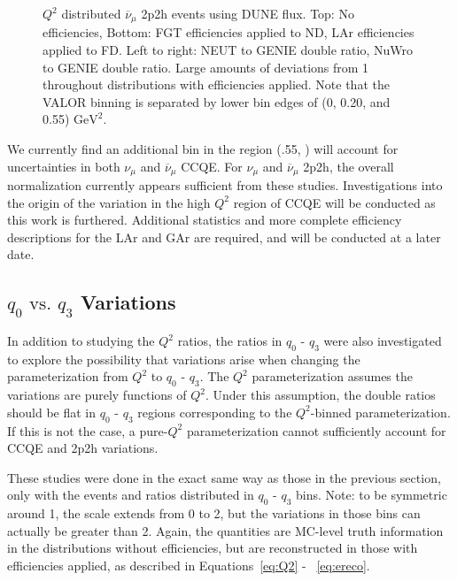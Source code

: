 \documentclass[12pt]{article}
\newcommand{\textapprox}{\raisebox{0.5ex}{\texttildelow}}
\begin{document}
\begin{figure}[h]
\endminipage
\caption{$Q^2$ distributed $\overline{\nu}_{\mu}$ 2p2h events using DUNE flux. Top: No efficiencies, Bottom: FGT efficiencies applied to ND, LAr efficiencies applied to FD. Left to right: NEUT to GENIE double ratio, NuWro to GENIE double ratio. Large amounts of deviations from 1 throughout distributions with efficiencies applied. Note that the VALOR binning is separated by lower bin edges of (0, 0.20, and 0.55) $\textrm{GeV}^2$.}
\label{fig:Q2_2p2h_numubar_no_eff}
\end{figure}
\FloatBarrier

We currently find an additional bin in the region (.55, \textapprox{1.25}) will account for uncertainties in both $\nu_{\mu}$ and $\overline{\nu}_{\mu}$ CCQE. For $\nu_{\mu}$ and $\overline{\nu}_{\mu}$ 2p2h, the overall normalization currently appears sufficient from these studies. Investigations into the origin of the variation in the high $Q^2$ region of CCQE will be conducted as this work is furthered. Additional statistics and more complete efficiency descriptions for the LAr and GAr are required, and will be conducted at a later date.

\subsection{$q_0 \textrm{ vs. } q_3$ Variations}
\label{subsec:q0q3}
In addition to studying the $Q^2$ ratios, the ratios in $q_0 \textrm{ - } q_3$ were also investigated to explore the possibility that variations arise when changing the parameterization from $Q^2$ to $q_0 \textrm{ - } q_3$. The $Q^2$ parameterization assumes the variations are purely functions of $Q^2$. Under this assumption, the double ratios should be flat in $q_0 \textrm{ - } q_3$ regions corresponding to the $Q^2$-binned parameterization. If this is not the case, a pure-$Q^2$ parameterization cannot sufficiently account for CCQE and 2p2h variations.

These studies were done in the exact same way as those in the previous section, only with the events and ratios distributed in $q_0 \textrm{ - } q_3$ bins. Note: to be symmetric around 1, the scale extends from 0 to 2, but the variations in those bins can actually be greater than 2. Again, the quantities are MC-level truth information in the distributions without efficiencies, but are reconstructed in those with efficiencies applied, as described in Equations~\ref{eq:Q2} - ~\ref{eq:ereco}.
\end{document}
